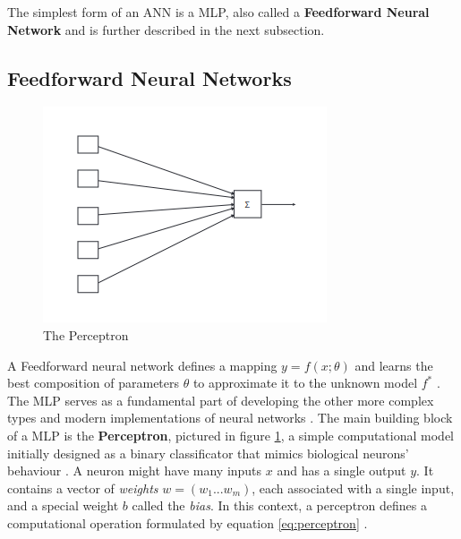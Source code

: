 The simplest form of an \ac{ANN} is a \ac{MLP}, also called a \textbf{Feedforward Neural Network} and is further described in the next subsection. \par 

\subsection{Feedforward Neural Networks} \label{sec:back-mlp}

\begin{figure}[ht!]
	\centering
	\includegraphics[width=0.50\linewidth]{./figures/perceptron.png}
	\caption{The Perceptron \cite{charniakIntroductionDeepLearning2018}}
	\label{fig:perceptron}
\end{figure}

A Feedforward neural network defines a mapping $y=f(x;\theta)$ and learns the best composition of parameters $\theta$ to approximate it to the unknown model $f^*$ \cite{charniakIntroductionDeepLearning2018, goodfellowDeepLearning2016}. The \ac{MLP} serves as a fundamental part of developing the other more complex types and modern implementations of neural networks \cite{charniakIntroductionDeepLearning2018}. 
The main building block of a \ac{MLP} is the \textbf{Perceptron}, pictured in figure \ref{fig:perceptron}, a simple computational model initially designed as a binary classificator that mimics biological neurons' behaviour \cite{charniakIntroductionDeepLearning2018}. A neuron might have many inputs $x$ and has a single output $y$. It contains a vector of \textit{weights} $w = (w_1 ... w_m)$, each associated with a single input, and a special weight $b$ called the \textit{bias}. In this context, a perceptron defines a computational operation formulated by equation \ref{eq:perceptron} \cite{charniakIntroductionDeepLearning2018}. \par

